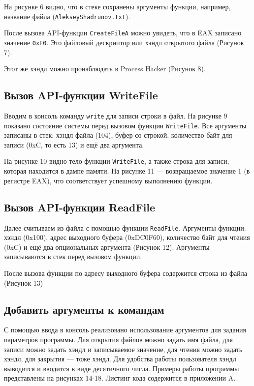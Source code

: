 На рисунке 6 видно, что в стеке сохранены аргументы функции, например, название файла (\texttt{AlekseyShadrunov.txt}). 

После вызова API-функции \texttt{CreateFileA} можно увидеть, что в EAX записано
значение \texttt{0xE0}. Это файловый дескриптор или хэндл открытого файла (Рисунок 7). 

Этот же хэндл можно пронаблюдать в Process Hacker (Рисунок 8). 
\FloatBarrier



\subsection{Вызов API-функции WriteFile}
Вводим в консоль команду \texttt{write} для записи строки в файл. На рисунке 9 показано состояние системы перед вызовом функции \texttt{WriteFile}. Все аргументы записаны в стек: хэндл файла (104), буфер со строкой, количество байт для записи (0xC, то есть 13) и ещё два аргумента. 

На рисунке 10 видно тело функции \texttt{WriteFile}, а также строка для записи, которая находится в дампе памяти. На рисунке 11 — возвращаемое значение 1 (в регистре EAX), что соответствует успешному выполнению функции.
\FloatBarrier


\subsection{Вызов API-функции ReadFile}
Далее считываем из файла с помощью функции \texttt{ReadFile}. Аргументы функции: хэндл (0x100), адрес выходного буфера (0xDC0F60), количество байт для чтения (0xC) и ещё два опциональных аргумента (Рисунок 12). Аргументы записываются в стек перед вызовом функции.

После вызова функции по адресу выходного буфера содержится строка из файла (Рисунок 13)
\FloatBarrier



\subsection{Добавить аргументы к командам}
С помощью ввода в консоль реализовано использование аргументов для задания параметров программы. Для открытия файлов можно задать имя файла, для записи можно задать хэндл и записываемое значение, для чтения можно задать хэндл, для закрытия — тоже хэндл. Для удобства работы пользователя хэндл выводится и вводится в виде десятичного числа. Примеры работы программы представлены на рисунках 14-18. Листинг кода содержится в приложении A. 

